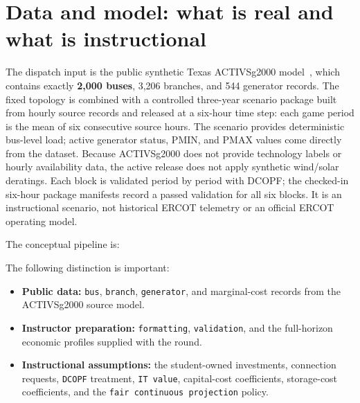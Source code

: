 \documentclass[12pt]{article}
\newcommand{\code}[1]{\texttt{#1}}
\begin{document}
\section{Data and model: what is real and what is instructional}

The dispatch input is the public synthetic Texas ACTIVSg2000 model~\cite{activsg2000}, which
contains exactly \textbf{2,000 buses}, 3,206 branches, and 544 generator
records. The fixed topology is combined with a controlled three-year scenario
package built from hourly source records and released at a six-hour time step:
each game period is the mean of six consecutive source hours. The scenario
provides deterministic bus-level load; active
generator status, PMIN, and PMAX values come directly from the dataset. Because
ACTIVSg2000 does not provide technology labels or hourly availability data, the
active release does not apply synthetic wind/solar deratings. Each block is
validated period by period with DCOPF; the checked-in six-hour package
manifests record a passed validation for all six blocks.
It is an instructional scenario, not historical ERCOT telemetry or an official
ERCOT operating model.

The conceptual pipeline is:
\begin{center}
\end{center}

The following distinction is important:
\begin{itemize}[leftmargin=*]
  \item \textbf{Public data:} \code{bus}, \code{branch}, \code{generator}, and
  marginal-cost records from the ACTIVSg2000 source model.
  \item \textbf{Instructor preparation:} 
  \code{formatting}, \code{validation}, and the full-horizon economic profiles supplied with the round.
  \item \textbf{Instructional assumptions:} the student-owned investments,
  connection requests, \code{DCOPF} treatment, \code{IT value}, capital-cost coefficients,
  storage-cost coefficients, and the \code{fair continuous projection} policy.
\end{itemize}
\end{document}
